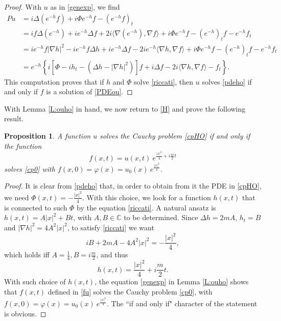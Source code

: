 \documentclass[11pt,a4paper]{amsart}
\def \vf{\varphi}
\numberwithin{equation}{section}
\newtheorem{proposition}[theorem]{Proposition}
\numberwithin{equation}{section}
\begin{document}
\begin{proof}
With $u$ as in \eqref{genexp}, we find
\begin{align*}
P u & = i \Delta(e^{-h} f) + i \Phi e^{-h} f - (e^{-h} f)_t
\\
& = i f \Delta(e^{-h}) + i e^{-h} \Delta f + 2 i \langle\nabla(e^{-h}),\nabla f\rangle + i \Phi e^{-h} f
 - (e^{-h})_t f -  e^{-h} f_t
\\
& = i e^{-h} f |\nabla h|^2 - i e^{-h} f \Delta h + i e^{-h} \Delta f - 2 i e^{-h} \langle\nabla h,\nabla f\rangle + i \Phi e^{-h} f
 - (e^{-h})_t f -  e^{-h} f_t
 \\
 & = e^{-h}\left\{i \left[\Phi - i h_t - (\Delta h - |\nabla h|^2 )\right] f + i \Delta f - 2 i \langle\nabla h,\nabla f\rangle - f_t\right\}.
\end{align*}
This computation proves that if $h$ and $\Phi$ solve \eqref{riccati}, then $u$ solves \eqref{pdeho} if and only if $f$ is a solution of \eqref{PDEou}.


\end{proof}


With Lemma \ref{L:ouho} in hand, we now return to \eqref{H} and prove the following result.
\begin{proposition}\label{P:connect}
A function $u$ solves the Cauchy problem \eqref{cpHO} if and only if the function
\begin{equation}\label{fu}
f(x,t) =  u(x,t)\ e^{\frac{|x|^2}4 + i \frac m2 t}
\end{equation}
solves \eqref{cp0} with $f(x,0) = \vf(x) = u_0(x)\ e^{\frac{|x|^2}4}$.
\end{proposition}

\begin{proof}
It is clear from \eqref{pdeho} that, in order to obtain from it the PDE in \eqref{cpHO}, we need  $\Phi(x,t) = - \frac{|x|^2}4$. With this choice, we look for a function $h(x,t)$ that is connected to such $\Phi$ by the equation \eqref{riccati}. A natural ansatz is $h(x,t) = A |x|^2 + B t$, with $A, B\in \mathbb C$ to be determined. Since $\Delta h = 2m A$, $h_t = B$ and $|\nabla h|^2 = 4 A^2 |x|^2$, to satisfy \eqref{riccati} we want
\[
i B + 2m A - 4 A^2 |x|^2 = - \frac{|x|^2}4,
\]
which holds iff $A = \frac{1}4, B =  i \frac m2$, and thus
\begin{equation}\label{h}
h(x,t) = \frac{|x|^2}4 + i \frac m2 t.
\end{equation}
With such choice of $h(x,t)$, the equation \eqref{genexp} in Lemma \ref{L:ouho} shows that $f(x,t)$ defined in \eqref{fu} solves the Cauchy problem \eqref{cp0}, with $f(x,0) = \vf(x) = u_0(x)\ e^{\frac{|x|^2}4}$. The ``if and only if" character of the statement is obvious.

\end{proof}
\end{document}
